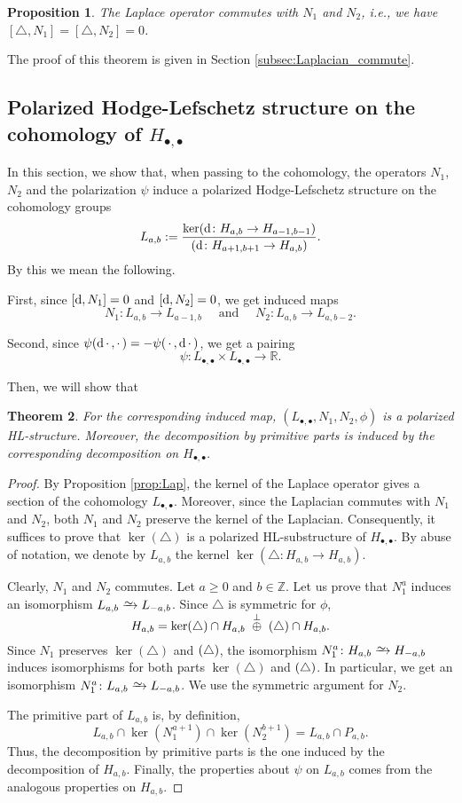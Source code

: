 \documentclass[11pt]{amsart}
\newtheorem{thm}{Theorem}[section]
\newtheorem{prop}[thm]{Proposition}
\theoremstyle{definition}
\numberwithin{equation}{section}
\newcommand{\ie}{i.e.}
\renewcommand{\~}{\widetilde}
\newcommand{\Z}{\mathbb{Z}}
\newcommand{\R}{\mathbb{R}}
\newcommand{\simto}{\xrightarrow{\raisebox{-3pt}[0pt][0pt]{\small$\hspace{-1pt}\sim$}}}
\newcommand{\myand}{\text{ and }}
\newcommand{\bul}{\bullet} %
\newcommand{\ccdot}{\,\cdot\,}
\newcommand{\rdot}{\cdot\,}
\let\Im\relax
\DeclareMathOperator{\Im}{Im} %
\renewcommand{\d}{{\rm d}} %
\newcommand{\ooplus}{\raisebox{0pt}[0pt]{${}\overset\perp\oplus{}$}} %
\newcommand{\wooplus}{\ \ooplus\ } %
\newcommand{\Lap}{\triangle} %
\begin{document}
\begin{prop}\label{prop:commutativity} The Laplace operator commutes with $N_1$ and $N_2$, \ie, we have $[\Lap,N_1]=[\Lap,N_2]=0$.
\end{prop}
The proof of this theorem is given in Section \ref{subsec:Laplacian_commute}.



\subsection{Polarized Hodge-Lefschetz structure on the cohomology of $H_{\bul,\bul}$}

In this section, we show that, when passing to the cohomology, the operators $N_1$, $N_2$ and the polarization $\psi$ induce a polarized Hodge-Lefschetz structure on the cohomology groups
\[ L_{a,b} := \frac{\ker(\d\colon H_{a,b}\to H_{a-1,b-1})}{\Im(\d\colon H_{a+1,b+1}\to H_{a,b})}. \]
By this we mean the following.

First, since $[\d, N_1] =0$ and $[\d,N_2]=0$, we get induced maps
\[ N_1 \colon L_{a,b} \to L_{a-1, b} \quad\myand\quad N_2\colon L_{a,b} \to L_{a, b-2}. \]

Second, since $\psi(\d\ccdot,\rdot)=-\psi(\ccdot,\d\ccdot)$, we get a pairing
\[ \psi\colon L_{\bul,\bul}\times L_{\bul,\bul} \to \R. \]

Then, we will show that
\begin{thm} \label{thm:differential_HL-structure}
For the corresponding induced map, $(L_{\bul,\bul}, N_1, N_2, \phi)$ is a polarized HL-structure. Moreover, the decomposition by primitive parts is induced by the corresponding decomposition on $H_{\bul,\bul}$.
\end{thm}

\begin{proof}
By Proposition \ref{prop:Lap}, the kernel of the Laplace operator gives a section of the cohomology $L_{\bul,\bul}$. Moreover, since the Laplacian commutes with $N_1$ and $N_2$, both $N_1$ and $N_2$ preserve the kernel of the Laplacian. Consequently, it suffices to prove that $\ker(\Lap)$ is a polarized HL-substructure of $H_{\bul,\bul}$. By abuse of notation, we denote by $L_{a,b}$ the kernel $\ker(\Lap\colon H_{a,b}\to H_{a,b})$.

Clearly, $N_1$ and $N_2$ commutes. Let $a\geq 0$ and $b\in\Z$. Let us prove that $N_1^a$ induces an isomorphism $L_{a,b}\simto L_{-a,b}$. Since $\Lap$ is symmetric for $\phi$,
\[ H_{a,b}=\ker(\Lap)\cap H_{a,b} \wooplus \Im(\Lap)\cap H_{a,b}. \]
Since $N_1$ preserves $\ker(\Lap)$ and $\Im(\Lap)$, the isomorphism $N_1^a\colon H_{a,b}\simto H_{-a,b}$ induces isomorphisms for both parts $\ker(\Lap)$ and $\Im(\Lap)$. In particular, we get an isomorphism $N_1^a\colon L_{a,b}\simto L_{-a,b}$. We use the symmetric argument for $N_2$.

The primitive part of $L_{a,b}$ is, by definition,
\[ L_{a,b}\cap\ker(N_1^{a+1})\cap\ker(N_2^{b+1})=L_{a,b}\cap P_{a,b}. \]
Thus, the decomposition by primitive parts is the one induced by the decomposition of $H_{a,b}$. Finally, the properties about $\psi$ on $L_{a,b}$ comes from the analogous properties on $H_{a,b}$.
\end{proof}
\end{document}
